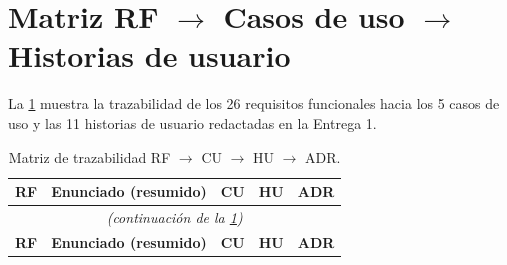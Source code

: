 \documentclass[11pt,a4paper,twoside]{report}
\begin{document}
\section{Matriz RF $\to$ Casos de uso $\to$ Historias de usuario}
\label{sec:matriz}

La \cref{tab:matriz} muestra la trazabilidad de los 26 requisitos funcionales hacia los 5 casos de uso y las 11 historias de usuario redactadas en la Entrega 1.

\begin{longtable}{@{}p{1.5cm}p{4.5cm}p{2.5cm}p{2.5cm}p{2.5cm}@{}}
    \caption{Matriz de trazabilidad RF $\to$ CU $\to$ HU $\to$ ADR.}
    \label{tab:matriz}\\
    \toprule
    \textbf{RF} & \textbf{Enunciado (resumido)} & \textbf{CU} & \textbf{HU} & \textbf{ADR} \\
    \midrule
    \endfirsthead
    \multicolumn{5}{c}{\itshape (continuaci\'on de la \cref{tab:matriz})}\\
    \toprule
    \textbf{RF} & \textbf{Enunciado (resumido)} & \textbf{CU} & \textbf{HU} & \textbf{ADR} \\
    \midrule
    \endhead


\end{longtable}
\end{document}
